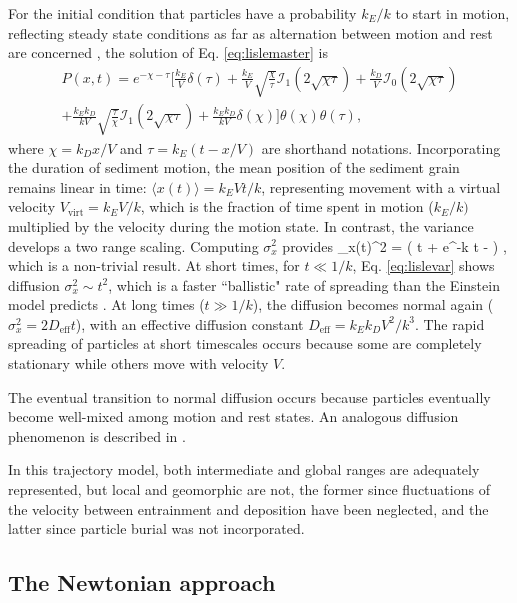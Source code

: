 For the initial condition that particles have a probability $k_E/k$ to start in motion, reflecting steady state conditions as far as alternation between motion and rest are concerned \citep[e.g.][]{Ancey2006}, the solution of Eq. \ref{eq:lislemaster} is \citep{Lisle1998}
\begin{multline}  P(x,t) =  e^{-\chi-\tau} \Big[ \frac{k_E}{V}\delta(\tau) + \frac{k_E}{V} \sqrt{\frac{\chi}{\tau}}\mathcal{I}_1(2\sqrt{\chi\tau}) + \frac{k_D}{V}\mathcal{I}_0(2\sqrt{\chi\tau}) \\
	+ \frac{k_Ek_D}{kV}\sqrt{\frac{\tau}{\chi}}\mathcal{I}_1(2\sqrt{\chi\tau}) + \frac{k_Ek_D}{kV} \delta(\chi)
	\Big]\theta(\chi)\theta(\tau), \label{eq:lisledist}
\end{multline}
where $\chi = k_D x/V$ and $\tau = k_E(t-x/V)$ are shorthand notations.
Incorporating the duration of sediment motion, the mean position of the sediment grain remains linear in time: $\langle x (t) \rangle  = k_E V t/k$, representing movement with a virtual velocity $V_\text{virt} = k_E V/k$, which is the fraction of time spent in motion ($k_E/k)$ \citep{Ancey2006} multiplied by the velocity during the motion state. In contrast, the variance develops a two range scaling.
Computing $\sigma_x^2$ provides
\be \sigma_x(t)^2 = \Big( t + e^{-k t} - \Big) , \label{eq:lislevar}\ee
which is a non-trivial result. At short times, for $t\ll 1/k$, Eq. \ref{eq:lislevar} shows diffusion $\sigma_x^2 \sim t^2$, which is a faster ``ballistic" rate of spreading than the Einstein model predicts \citep{Sokolov2012}. At long times ($t\gg 1/k$), the diffusion becomes normal again ($\sigma_x^2 = 2 D_\text{eff} t$), with an effective diffusion constant $ D_\text{eff} = k_E k_D V^2/k^3$. 
The rapid spreading of particles at short timescales occurs because some are completely stationary while others move with velocity $V$.

The eventual transition to normal diffusion occurs because particles eventually become well-mixed among motion and rest states. An analogous diffusion phenomenon is described in \citet{Taylor1920}.

In this trajectory model, both intermediate and global ranges are adequately represented, but local and geomorphic are not, the former since fluctuations of the velocity between entrainment and deposition have been neglected, and the latter since particle burial was not incorporated.

\subsection{The Newtonian approach}

